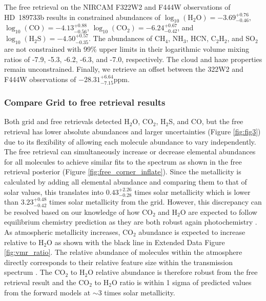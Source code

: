 \documentclass[sn-standardnature]{sn-jnl}%
\begin{document}
The free retrieval on the NIRCAM F322W2 and F444W observations of HD~189733b results in constrained abundances of $\log_{10}(\text{H}_2\text{O})=-3.69^{+0.76}_{-0.46}$, $\log_{10}(\text{CO})=-4.13^{+0.88}_{-0.56}$, $\log_{10}(\text{CO}_2)=-6.24^{+0.67}_{-0.42}$, and  $\log_{10}(\text{H}_2\text{S})=-4.50^{+0.57}_{-0.35}$. The abundances of CH$_4$, NH$_3$, HCN, C$_2$H$_2$, and SO$_2$ are not constrained with 99\% upper limits in their logarithmic volume mixing ratios of -7.9, -5.3, -6.2, -6.3, and -7.0, respectively. The cloud and haze properties remain unconstrained. Finally, we retrieve an offset between the 322W2 and F444W observations of $-28.31^{+6.64}_{-7.15}$ppm.


\subsubsection*{Compare Grid to free retrieval results}

Both grid and free retrievals detected H$_2$O, CO$_2$, H$_2$S, and CO, but the free retrieval has lower absolute abundances and larger uncertainties (Figure \ref{fig:fig3}) due to its flexibility of allowing each molecule abundance to vary independently. The free retrieval can simultaneously increase or decrease elemental abundances for all molecules to achieve similar fits to the spectrum as shown in the free retrieval posterior (Figure \ref{fig:free_corner_inflate}). Since the metallicity is calculated by adding all elemental abundance and comparing them to that of solar values, this translates into $0.43^{+2.26}_{-0.28}$ times solar metallicity which is lower than $3.23^{+0.48}_{-0.42}$ times solar metallicity from the grid. However, this discrepancy can be resolved based on our knowledge of how CO$_2$ and H$_2$O are expected to follow equilibrium chemistry prediction as they are both robust again photochemistry . As atmospheric metallicity increases, CO$_2$ abundance is expected to increase relative to H$_2$O as shown with the black line in Extended Data Figure \ref{fig:vmr_ratio}. The relative abundance of molecules within the atmosphere directly corresponds to their relative feature size within the transmission spectrum . The CO$_2$ to H$_2$O relative abundance is therefore robust from the free retrieval result and the CO$_2$ to H$_2$O ratio is within 1 sigma of predicted values from the forward models at $\sim$3 times solar metallicity. 
\end{document}
